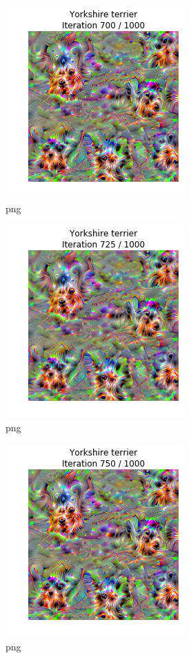 \documentclass[]{book}
\theoremstyle{definition}
\theoremstyle{definition}
\theoremstyle{definition}
\theoremstyle{remark}
\begin{document}
\begin{figure}
\centering
\includegraphics{Network-Visualization-TensorFlow_files/Network-Visualization-TensorFlow_24_29.png}
\caption{png}
\end{figure}

\begin{figure}
\centering
\includegraphics{Network-Visualization-TensorFlow_files/Network-Visualization-TensorFlow_24_30.png}
\caption{png}
\end{figure}

\begin{figure}
\centering
\includegraphics{Network-Visualization-TensorFlow_files/Network-Visualization-TensorFlow_24_31.png}
\caption{png}
\end{figure}
\end{document}
